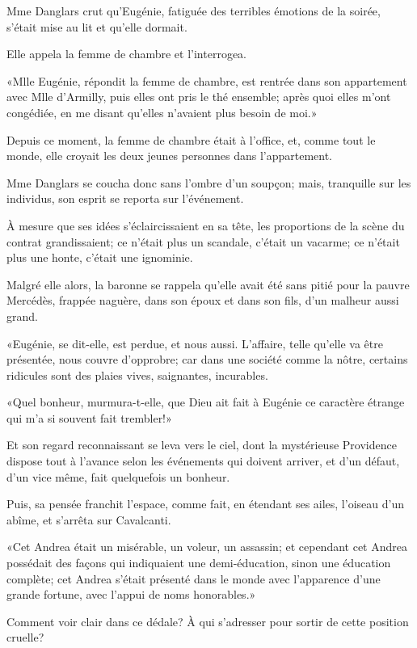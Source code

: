 Mme Danglars crut qu'Eugénie, fatiguée des terribles émotions de la soirée, s'était mise au lit et qu'elle dormait. 

Elle appela la femme de chambre et l'interrogea. 

«Mlle Eugénie, répondit la femme de chambre, est rentrée dans son appartement avec Mlle d'Armilly, puis elles ont pris le thé ensemble; après quoi elles m'ont congédiée, en me disant qu'elles n'avaient plus besoin de moi.» 

Depuis ce moment, la femme de chambre était à l'office, et, comme tout le monde, elle croyait les deux jeunes personnes dans l'appartement. 

Mme Danglars se coucha donc sans l'ombre d'un soupçon; mais, tranquille sur les individus, son esprit se reporta sur l'événement. 

À mesure que ses idées s'éclaircissaient en sa tête, les proportions de la scène du contrat grandissaient; ce n'était plus un scandale, c'était un vacarme; ce n'était plus une honte, c'était une ignominie. 

Malgré elle alors, la baronne se rappela qu'elle avait été sans pitié pour la pauvre Mercédès, frappée naguère, dans son époux et dans son fils, d'un malheur aussi grand. 

«Eugénie, se dit-elle, est perdue, et nous aussi. L'affaire, telle qu'elle va être présentée, nous couvre d'opprobre; car dans une société comme la nôtre, certains ridicules sont des plaies vives, saignantes, incurables. 

«Quel bonheur, murmura-t-elle, que Dieu ait fait à Eugénie ce caractère étrange qui m'a si souvent fait trembler!» 

Et son regard reconnaissant se leva vers le ciel, dont la mystérieuse Providence dispose tout à l'avance selon les événements qui doivent arriver, et d'un défaut, d'un vice même, fait quelquefois un bonheur. 

Puis, sa pensée franchit l'espace, comme fait, en étendant ses ailes, l'oiseau d'un abîme, et s'arrêta sur Cavalcanti. 

«Cet Andrea était un misérable, un voleur, un assassin; et cependant cet Andrea possédait des façons qui indiquaient une demi-éducation, sinon une éducation complète; cet Andrea s'était présenté dans le monde avec l'apparence d'une grande fortune, avec l'appui de noms honorables.» 

Comment voir clair dans ce dédale? À qui s'adresser pour sortir de cette position cruelle? 

